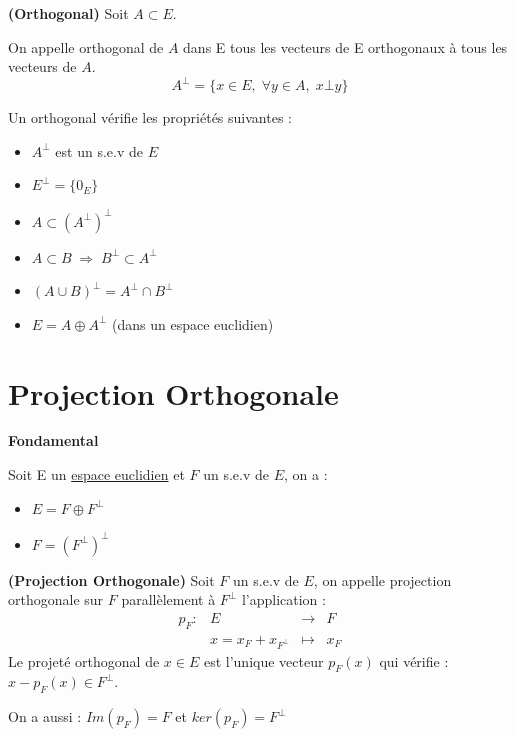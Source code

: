 \begin{definition}
    \textbf{(Orthogonal)}
    Soit $A \subset E $.

    On appelle orthogonal de $A$ dans E tous les vecteurs de E orthogonaux à tous les vecteurs de $A$. 
    \[ \boxed { A^{\bot} = \{ x \in E, \; \forall y \in A, \; x \bot y \} } \] 

    Un orthogonal vérifie les propriétés suivantes : 
    \begin{itemize}
        \item $A^{\bot} $ est un s.e.v de $E$
        \item $E^{\bot} = \{ 0_E \} $
        \item $ A \subset (A^{\bot})^{\bot} $
        \item $ A \subset B \; \Longrightarrow \; B^{\bot} \subset A^{\bot} $
        \item $ (A \cup B)^{\bot} = A^\bot \cap B^\bot $
        \item $E = A \oplus A^\bot $ (dans un espace euclidien)
    \end{itemize}
\end{definition}



\section*{Projection Orthogonale}

\begin{theorem}
    \textbf{Fondamental}

    Soit E un \underline{espace euclidien} et $F$ un s.e.v de $E$, on a :
    \begin{itemize}
        \item $E = F \oplus F^\bot $
        \item $ F = (F^{\bot})^{\bot} $
    \end{itemize}

\end{theorem}

\begin{definition}
    \textbf{(Projection Orthogonale)}
    Soit $F$ un s.e.v de $E$, on appelle projection orthogonale sur $F$ parallèlement à $F^{\bot}$ l'application :
    \[ 
        \begin{array}{cccc}
            p_F : & E & \longrightarrow & F \\
            & x = x_F + x_{F^\bot} & \longmapsto & x_F             
        \end{array}
    \]
    Le projeté orthogonal de $x \in E$ est l'unique vecteur $p_F(x)$ qui vérifie : $ x - p_F(x) \in F^\bot $.

    On a aussi : $ Im(p_F) = F $ et $ ker(p_F) = F^\bot $


\end{definition}

